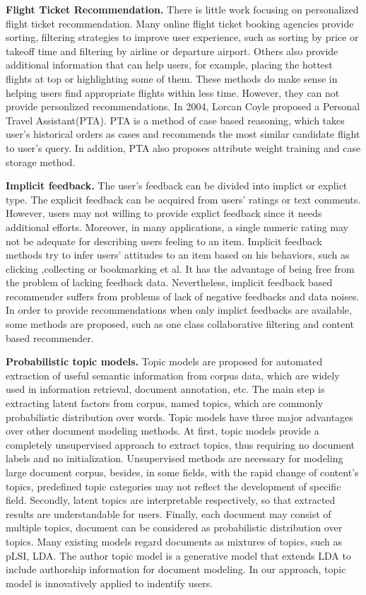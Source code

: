 \documentclass{sig-alternate-05-2015}
\begin{document}
\textbf{Flight Ticket Recommendation.} There is little work focusing on personalized flight ticket recommendation. Many online flight ticket booking agencies provide sorting, filtering strategies to improve user experience, such as sorting by price or takeoff time and filtering by airline or departure airport. Others also provide additional information that can help users, for example, placing the hottest flights at top or highlighting some of them. These methods do make sense in helping users find appropriate flights within less time. However, they can not provide personlized recommendations. In 2004, Lorcan Coyle\cite{lor:flight} proposed a Personal Travel Assistant(PTA). PTA is a method of case based reasoning, which takes user's historical orders as cases and recommends the most similar candidate flight to user's query. In addition, PTA also proposes attribute weight training and case storage method.\par
\textbf{Implicit feedback.} The user's feedback can be divided into implict  or explict type. The explicit feedback can be acquired from users' ratings or text comments. However,  users may not willing to provide explict feedback since it needs additional efforts. Moreover, in many applications, a single numeric rating may not be adequate for describing users feeling to an item. Implicit feedback methods\cite{song:mining} try to infer users' attitudes to an item based on his behaviors, such as clicking ,collecting or bookmarking et al. It has the advantage of being free from the problem of lacking feedback data. Nevertheless, implicit feedback based recommender suffers from problems of lack of negative feedbacks and data noises. In order to provide recommendations when only implict feedbacks are available, some methods are proposed, such as one class collaborative filtering and content based recommender.\par
\textbf{Probabilistic topic models.}  Topic models\cite{blei:lda}\cite{mic:atm}\cite{mark:prob} are proposed for automated extraction of useful semantic information from corpus data, which are widely used in information retrieval, document annotation, etc. The main step is extracting latent factors from corpus, named topics, which are commonly probabilistic distribution over words. Topic models have three major advantages over other document modeling methods. At first, topic models provide a completely unsupervised approach to extract topics, thus requiring no document labels and no initialization. Unsupervised methods are necessary for modeling large document corpus, besides, in some fields, with the rapid change of content's topics, predefined topic categories may not reflect the development of specific field. Secondly, latent topics are interpretable respectively, so that extracted results are understandable for users. Finally, each document may consist of multiple topics, document can be considered as probabilistic distribution over topics. Many existing models regard documents as mixtures of topics, such as pLSI, LDA. The author topic model is a generative model that extends LDA to include authorship information for document modeling. In our approach, topic model is innovatively applied to indentify users. \par
\end{document}
